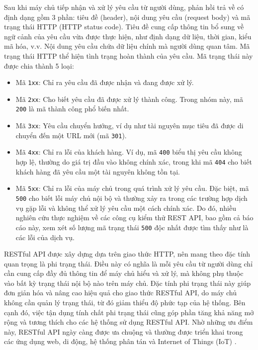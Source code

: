 Sau khi máy chủ tiếp nhận và xử lý yêu cầu từ người dùng, phản hồi trả về có định dạng gồm 3 phần: tiêu đề (header), nội dung yêu cầu (request body) và mã trạng thái HTTP (HTTP status code). Tiêu đề cung cấp thông tin bổ sung về ngữ cảnh của yêu cầu vừa được thực hiện, như định dạng dữ liệu, thời gian, kiểu mã hóa, v.v. Nội dung yêu cầu chứa dữ liệu chính mà người dùng quan tâm. Mã trạng thái HTTP thể hiện tình trạng hoàn thành của yêu cầu. Mã trạng thái này được chia thành 5 loại:
\begin{itemize}
        \item Mã \texttt{1xx}: Chỉ ra yêu cầu đã được nhận và đang được xử lý.
        \item Mã \texttt{2xx}: Cho biết yêu cầu đã được xử lý thành công. Trong nhóm này, mã \texttt{200} là mã thành công phổ biến nhất.
        \item Mã \texttt{3xx}: Yêu cầu chuyển hướng, ví dụ như tài nguyên mục tiêu đã được di chuyển đến một URL mới (mã \texttt{301}).
        \item Mã \texttt{4xx}: Chỉ ra lỗi của khách hàng. Ví dụ, mã \texttt{400} biểu thị yêu cầu không hợp lệ, thường do giá trị đầu vào không chính xác, trong khi mã \texttt{404} cho biết khách hàng đã yêu cầu một tài nguyên không tồn tại.
        \item Mã \texttt{5xx}: Chỉ ra lỗi của máy chủ trong quá trình xử lý yêu cầu. Đặc biệt, mã \texttt{500} cho biết lỗi máy chủ nội bộ và thường xảy ra trong các trường hợp dịch vụ gặp lỗi và không thể xử lý yêu cầu một cách chính xác. Do đó, nhiều nghiên cứu thực nghiệm về các công cụ kiểm thử REST API, bao gồm cả báo cáo này, xem xét số lượng mã trạng thái \texttt{500} độc nhất được tìm thấy như là các lỗi của dịch vụ.
    \end{itemize}

RESTful API được xây dựng dựa trên giao thức HTTP, nên mang theo đặc tính quan trọng là phi trạng thái. Điều này có nghĩa là mỗi yêu cầu từ người dùng chỉ cần cung cấp đầy đủ thông tin để máy chủ hiểu và xử lý, mà không phụ thuộc vào bất kỳ trạng thái nội bộ nào trên máy chủ. Đặc tính phi trạng thái này giúp đơn giản hóa và nâng cao hiệu quả cho giao thức RESTful API, do máy chủ không cần quản lý trạng thái, từ đó giảm thiểu độ phức tạp của hệ thống. Bên cạnh đó, việc tận dụng tính chất phi trạng thái cũng góp phần tăng khả năng mở rộng và tương thích cho các hệ thống sử dụng RESTful API. Nhờ những ưu điểm này, RESTful API ngày càng được ưa chuộng và thường được triển khai trong các ứng dụng web, di động, hệ thống phân tán và Internet of Things (IoT) \cite{maurya2021application,biehl2016restful}.

